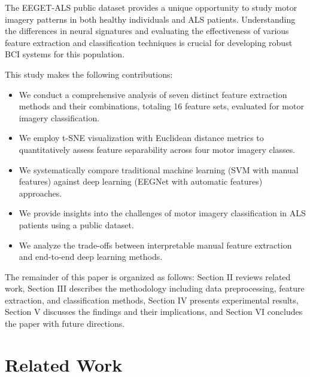 \documentclass[conference]{IEEEtran}
\begin{document}
The EEGET-ALS public dataset provides a unique opportunity to study motor imagery patterns in both healthy individuals and ALS patients. Understanding the differences in neural signatures and evaluating the effectiveness of various feature extraction and classification techniques is crucial for developing robust BCI systems for this population.

This study makes the following contributions:

\begin{itemize}
    \item We conduct a comprehensive analysis of seven distinct feature extraction methods and their combinations, totaling 16 feature sets, evaluated for motor imagery classification.
    \item We employ t-SNE visualization with Euclidean distance metrics to quantitatively assess feature separability across four motor imagery classes.
    \item We systematically compare traditional machine learning (SVM with manual features) against deep learning (EEGNet with automatic features) approaches.
    \item We provide insights into the challenges of motor imagery classification in ALS patients using a public dataset.
    \item We analyze the trade-offs between interpretable manual feature extraction and end-to-end deep learning methods.
\end{itemize}

The remainder of this paper is organized as follows: Section II reviews related work, Section III describes the methodology including data preprocessing, feature extraction, and classification methods, Section IV presents experimental results, Section V discusses the findings and their implications, and Section VI concludes the paper with future directions.

\section{Related Work}

\end{document}
